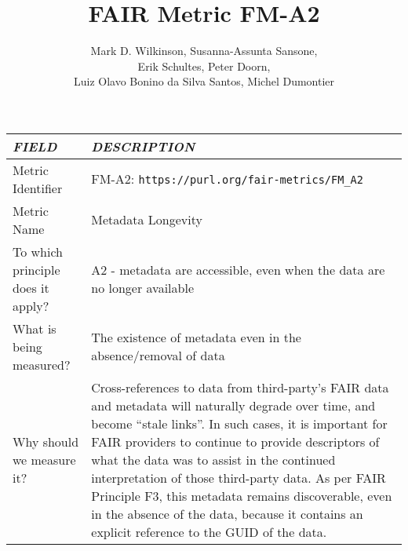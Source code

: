 \documentclass[english]{article}
\begin{document}
\title{FAIR Metric FM-A2}

\author{Mark D. Wilkinson, Susanna-Assunta Sansone, \\Erik Schultes, Peter Doorn,\\ 
Luiz Olavo Bonino da Silva Santos, Michel Dumontier}

\maketitle

\newpage





\begin{longtable}{|p{5cm}|p{9cm}|}


\hline
\emph{FIELD} & \emph{DESCRIPTION} \\
\hline
Metric Identifier &   FM-A2: \verb"https://purl.org/fair-metrics/FM_A2"
\\


\hline
Metric Name &   


Metadata Longevity


 \\



\hline
To which principle does it apply? &   


A2 - metadata are accessible, even when the data are no longer available

\\



\hline
What is being measured? & 


The existence of metadata even in the absence/removal of data


\\



\hline
Why should we measure it? & 



Cross-references to data from third-party’s FAIR data and metadata will naturally degrade over time, and become “stale links”.  In such cases, it is important for FAIR providers to continue to provide descriptors of what the data was to assist in the continued interpretation of those third-party data.  As per FAIR Principle F3, this metadata remains discoverable, even in the absence of the data, because it contains an explicit reference to the GUID of the data.
  
\\




\end{longtable}
\end{document}
